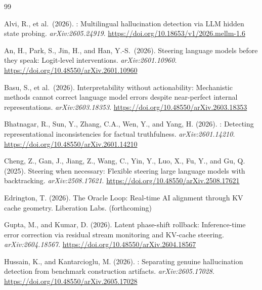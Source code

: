 \documentclass[11pt,letterpaper]{article}
\DeclareRobustCommand{\_}{\textunderscore\allowbreak}
\begin{document}
\begin{thebibliography}{99}

Alvi, R., et al.\ (2026).
: Multilingual hallucination detection via {LLM} hidden state probing.
\newblock \textit{arXiv:2605.24919}.
\newblock \url{https://doi.org/10.18653/v1/2026.mellm-1.6}

An, H., Park, S., Jin, H., and Han, Y.-S.\ (2026).
\newblock Steering language models before they speak: Logit-level interventions.
\newblock \textit{arXiv:2601.10960}.
\newblock \url{https://doi.org/10.48550/arXiv.2601.10960}

Basu, S., et al.\ (2026).
\newblock Interpretability without actionability: Mechanistic methods cannot correct language model
  errors despite near-perfect internal representations.
\newblock \textit{arXiv:2603.18353}.
\newblock \url{https://doi.org/10.48550/arXiv.2603.18353}

Bhatnagar, R., Sun, Y., Zhang, C.A., Wen, Y., and Yang, H. (2026).
: Detecting representational inconsistencies for factual truthfulness.
\newblock \textit{arXiv:2601.14210}.
\newblock \url{https://doi.org/10.48550/arXiv.2601.14210}

Cheng, Z., Gan, J., Jiang, Z., Wang, C., Yin, Y., Luo, X., Fu, Y., and Gu, Q. (2025).
\newblock Steering when necessary: Flexible steering large language models with backtracking.
\newblock \textit{arXiv:2508.17621}.
\newblock \url{https://doi.org/10.48550/arXiv.2508.17621}

Edrington, T. (2026).
\newblock The {Oracle} {Loop}: Real-time {AI} alignment through {KV} cache geometry.
\newblock Liberation Labs. (forthcoming)

Gupta, M., and Kumar, D. (2026).
\newblock Latent phase-shift rollback: Inference-time error correction via residual stream
  monitoring and {KV}-cache steering.
\newblock \textit{arXiv:2604.18567}.
\newblock \url{https://doi.org/10.48550/arXiv.2604.18567}

Hussain, K., and Kantarcioglu, M. (2026).
: Separating genuine hallucination detection from benchmark construction
  artifacts.
\newblock \textit{arXiv:2605.17028}.
\newblock \url{https://doi.org/10.48550/arXiv.2605.17028}


\end{thebibliography}
\end{document}
